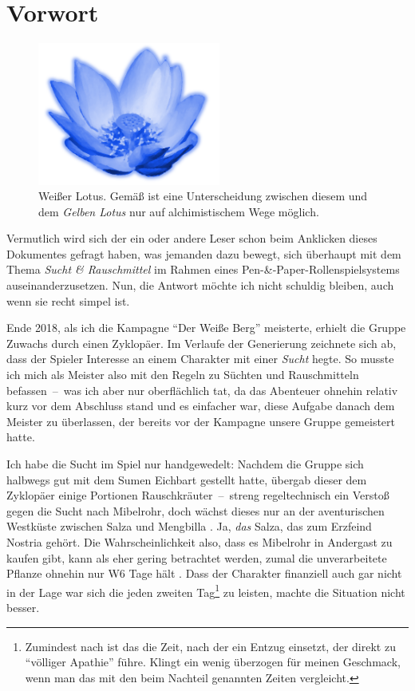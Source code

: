 \chapter*{Vorwort}
\begin{figure}[b]
	\begin{center}
		\includegraphics[width=6cm]{res/Nelumbo_lutea_blossom.png}
		\caption[Weißer Lotus]{Weißer Lotus. Gemäß  ist eine Unterscheidung zwischen diesem und dem \emph{Gelben Lotus} nur auf alchimistischem Wege möglich.\label{img-white-lotus}}
	\end{center}
\end{figure}

Vermutlich wird sich der ein oder andere Leser schon beim Anklicken dieses Dokumentes gefragt haben, was jemanden dazu bewegt, sich überhaupt mit dem Thema \emph{Sucht \& Rauschmittel} im Rahmen eines Pen-\&-Paper-Rollenspielsystems auseinanderzusetzen. Nun, die Antwort möchte ich nicht schuldig bleiben, auch wenn sie recht simpel ist.

Ende 2018, als ich die Kampagne \enquote{Der Weiße Berg} \cite{WB1,WB2} meisterte, erhielt die Gruppe Zuwachs durch einen Zyklopäer. Im Verlaufe der Generierung zeichnete sich ab, dass der Spieler Interesse an einem Charakter mit einer \emph{Sucht} hegte. So musste ich mich als Meister also mit den Regeln zu Süchten und Rauschmitteln befassen~--~was ich aber nur oberflächlich tat, da das Abenteuer ohnehin relativ kurz vor dem Abschluss stand und es einfacher war, diese Aufgabe danach dem Meister zu überlassen, der bereits vor der Kampagne unsere Gruppe gemeistert hatte.

Ich habe die Sucht im Spiel nur handgewedelt: Nachdem die Gruppe sich halbwegs gut mit dem Sumen Eichbart gestellt hatte, übergab dieser dem Zyklopäer einige Portionen Rauschkräuter~--~streng regeltechnisch ein Verstoß gegen die Sucht nach Mibelrohr, doch wächst dieses nur an der aventurischen Westküste zwischen Salza und Mengbilla \cite[S.~251]{ZBA}. Ja, \emph{das} Salza, das zum Erzfeind Nostria gehört. Die Wahrscheinlichkeit also, dass es Mibelrohr in Andergast zu kaufen gibt, kann als eher gering betrachtet werden, zumal die unverarbeitete Pflanze ohnehin nur W6 Tage hält \cite[S.~251]{ZBA}. Dass der Charakter finanziell auch gar nicht in der Lage war sich die  jeden zweiten Tag\footnote{Zumindest nach  ist das die Zeit, nach der ein Entzug einsetzt, der direkt zu \enquote{völliger Apathie} führe. Klingt ein wenig überzogen für meinen Geschmack, wenn man das mit den beim Nachteil genannten Zeiten vergleicht.} zu leisten, machte die Situation nicht besser.

